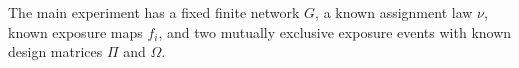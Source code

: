 The main experiment has a fixed finite network \(G\), a known assignment law \(\nu\), known exposure maps \(f_i\), and two mutually exclusive exposure events with known design matrices \(\Pi\) and \(\Omega\).